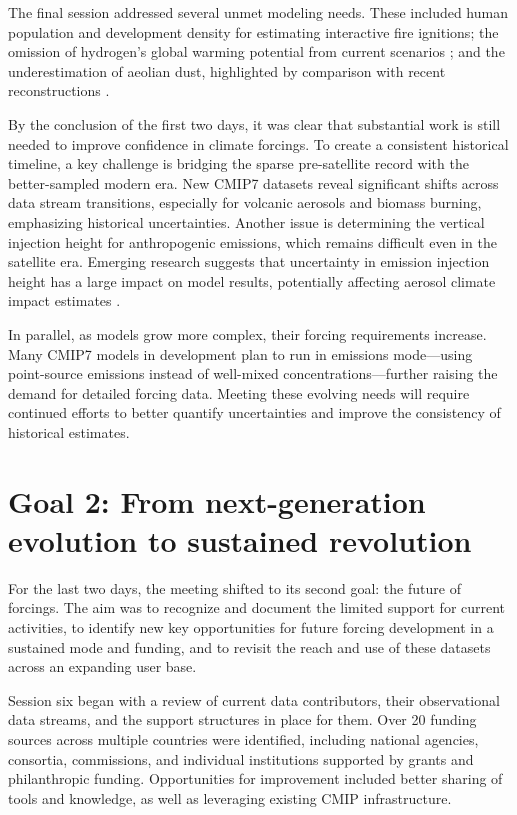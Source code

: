 \documentclass{ametsocV6.1}
\begin{document}
The final session addressed several unmet modeling needs. These included human population and development density for estimating interactive fire ignitions; the omission of hydrogen’s global warming potential from current scenarios \citep[e.g.,][]{sand_multi-model_2023}; and the underestimation of aeolian dust, highlighted by comparison with recent reconstructions \citep[e.g.,][]{kok_mineral_2023}.

By the conclusion of the first two days, it was clear that substantial work is still needed to improve confidence in climate forcings. To create a consistent historical timeline, a key challenge is bridging the sparse pre-satellite record with the better-sampled modern era. New CMIP7 datasets reveal significant shifts across data stream transitions, especially for volcanic aerosols and biomass burning, emphasizing historical uncertainties. Another issue is determining the vertical injection height for anthropogenic emissions, which remains difficult even in the satellite era. Emerging research suggests that uncertainty in emission injection height has a large impact on model results, potentially affecting aerosol climate impact estimates \citep[e.g.,][]{ahsan_emissions_2023}.

In parallel, as models grow more complex, their forcing requirements increase. Many CMIP7 models in development plan to run in emissions mode—using point-source emissions instead of well-mixed concentrations—further raising the demand for detailed forcing data. Meeting these evolving needs will require continued efforts to better quantify uncertainties and improve the consistency of historical estimates.

\section*{Goal 2: From next-generation evolution to sustained revolution}
For the last two days, the meeting shifted to its second goal: the future of forcings. The aim was to recognize and document the limited support for current activities, to identify new key opportunities for future forcing development in a sustained mode and funding, and to revisit the reach and use of these datasets across an expanding user base.

Session six began with a review of current data contributors, their observational data streams, and the support structures in place for them. Over 20 funding sources across multiple countries were identified, including national agencies, consortia, commissions, and individual institutions supported by grants and philanthropic funding. Opportunities for improvement included better sharing of tools and knowledge, as well as leveraging existing CMIP infrastructure.
\end{document}
